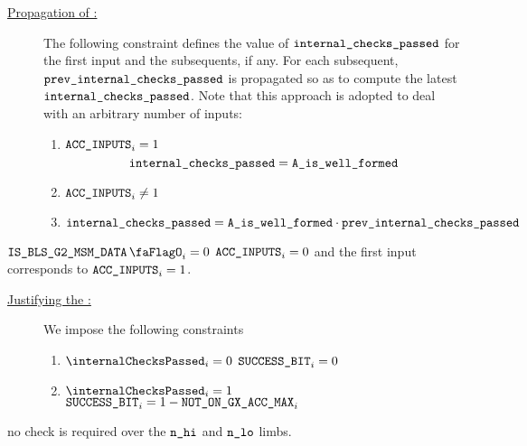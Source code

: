\begin{description}
    \item[\underline{Propagation of \locInternalChecksPassed:}]
          The following constraint defines the value of $\texttt{internal\_checks\_passed}$ for the first input and the subsequents, if any.
          For each subsequent, $\texttt{prev\_}\texttt{internal\_checks\_passed}$ is propagated so as to compute the latest $\texttt{internal\_checks\_passed}$.
          Note that this approach is adopted to deal with an arbitrary number of inputs:
          \begin{enumerate}
              \item \If $\texttt{ACC\_INPUTS}_{i} = 1$ \Then
                    \[
                        \texttt{internal\_checks\_passed} = \texttt{A\_is\_well\_formed} 
                    \]
              \item \If $\texttt{ACC\_INPUTS}_{i} \neq 1$ \Then
                    \item $\texttt{internal\_checks\_passed} = \texttt{A\_is\_well\_formed} \cdot \texttt{prev\_}\texttt{internal\_checks\_passed}$
          \end{enumerate}
\end{description}
\saNote{} \If $\isBlsGTwoMsmData_{i} = 0$ \Then $\texttt{ACC\_INPUTS}_{i} = 0$ and the first input corresponds to $\texttt{ACC\_INPUTS}_{i} = 1$.
\begin{description}
    \item[\underline{Justifying the \blsSuccessBit{}:}]
          We impose the following constraints
          \begin{enumerate}
              \item \If $\internalChecksPassed _{i}= 0$ \Then $\texttt{SUCCESS\_BIT} _{i} = 0$
              \item \If $\internalChecksPassed _{i}= 1$  \Then $\texttt{SUCCESS\_BIT}_{i} = 1 - \texttt{NOT\_ON\_GX\_ACC\_MAX} _{i}$
          \end{enumerate}
\end{description}

\saNote{} no check is required over the $\texttt{n}\texttt{\_hi}$ and $\texttt{n}\texttt{\_lo}$ limbs.